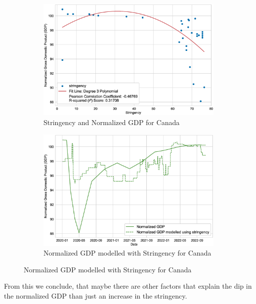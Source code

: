 \documentclass[tikz,fleqn,12pt]{wlscirep}
\begin{document}
\begin{figure}[H]
  \begin{subfigure}[t]{0.48\textwidth}
    \centering
    \includegraphics[width=\linewidth]{images/stringency_vs_gdp_CAN.eps}
    \caption{Stringency and Normalized GDP for Canada}
  \end{subfigure}
  \label{fig:stringency_vs_gdp_CAN}
  \hfill
  \begin{subfigure}[t]{0.48\textwidth}
    \centering
    \includegraphics[width=\linewidth]{images/gdp_modelled_with_stringency_CAN.eps}
    \caption{Normalized GDP modelled with Stringency for Canada}
  \end{subfigure}
  \label{fig:gdp_modelled_with_stringency_CAN}
\end{figure}

From this we conclude, that maybe there are other factors that explain the dip in the normalized GDP than just an increase in the stringency.
\end{document}
